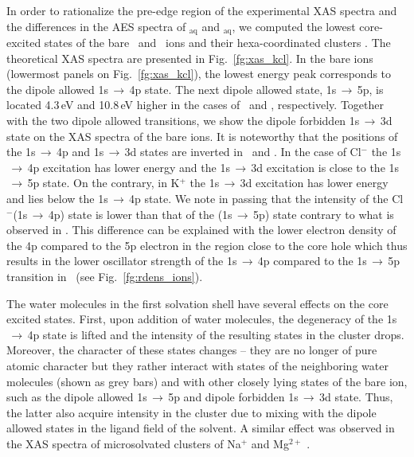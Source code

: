 In order to rationalize the pre-edge region of the experimental XAS spectra and the differences in the AES spectra of \ki$_{\text{aq}}$ and \cli$_{\text{aq}}$, we computed the lowest core-excited states of the bare \ki~and \cli~ions and their hexa-coordinated clusters . The theoretical XAS spectra are presented in Fig.\ \ref{fg:xas_kcl}. In the bare ions (lowermost panels on Fig.\ \ref{fg:xas_kcl}), the lowest energy peak corresponds to the dipole allowed 1s$\,\rightarrow\,$4p state. The next dipole allowed state, 1s$\,\rightarrow\,$5p, is located 4.3\,eV and 10.8\,eV higher in the cases of \ki~and \cli, respectively. Together with the two dipole allowed transitions, we show the dipole forbidden 1s$\,\rightarrow\,$3d state on the XAS spectra of the bare ions. It is noteworthy that the positions of the 1s$\,\rightarrow\,$4p and 1s$\,\rightarrow\,$3d states are inverted in \ki~and \cli. In the case of Cl$^{-}$ the 1s$\,\rightarrow\,$4p excitation has lower energy and the 1s$\,\rightarrow\,$3d excitation is close to the 1s$\,\rightarrow\,$5p state. On the contrary, in K$^{+}$ the 1s$\,\rightarrow\,$3d excitation has lower energy and lies below the 1s$\,\rightarrow\,$4p state. We note in passing that the intensity of the Cl$^{-}$(1s$\,\rightarrow\,$4p) state is lower than that of the \cli(1s$\,\rightarrow\,$5p) state contrary to what is observed in \ki. This difference can be explained with the lower electron density of the 4p compared to the 5p electron in the region close to the core hole which thus results in the lower oscillator strength of the 1s$\,\rightarrow\,$4p compared to the 1s$\,\rightarrow\,$5p transition in \cli~(see Fig.\ \ref{fg:rdens_ions}).


The water molecules in the first solvation shell have several effects on the core excited states. First, upon addition of water molecules, the degeneracy of the 1s$\,\rightarrow\,$4p state is lifted and the intensity of the resulting states in the cluster drops. Moreover, the character of these states changes -- they are no longer of pure atomic character but they rather interact with states of the neighboring water molecules (shown as grey bars) and with other closely lying states of the bare ion, such as the dipole allowed 1s$\,\rightarrow\,$5p and dipole forbidden 1s$\,\rightarrow\,$3d state. Thus, the latter also acquire intensity in the cluster due to mixing with the dipole allowed states in the ligand field of the solvent. A similar effect was observed in the XAS spectra of microsolvated clusters of Na$^{+}$ and Mg$^{2+}$ \citep{miteva16:16671}.


